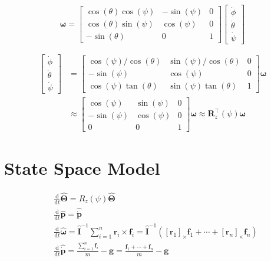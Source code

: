 \documentclass{article}
\begin{document}
$$
\boldsymbol{\omega}=\left[\begin{array}{ccc}
    \cos (\theta) \cos (\psi) & -\sin (\psi) & 0 \\
    \cos (\theta) \sin (\psi) & \cos (\psi) & 0 \\
    -\sin (\theta) & 0 & 1
    \end{array}\right]\left[\begin{array}{l}
    \dot{\phi} \\
    \dot{\theta} \\
    \dot{\psi}
\end{array}\right]
$$

\begin{align}
    \left[\begin{array}{l}
    \dot{\phi} \\
    \dot{\theta} \\
    \dot{\psi}
    \end{array}\right] &=\left[\begin{array}{ccc}
    \cos (\psi) / \cos (\theta) & \sin (\psi) / \cos (\theta) & 0 \\
    -\sin (\psi) & \cos (\psi) & 0 \\
    \cos (\psi) \tan (\theta) & \sin (\psi) \tan (\theta) & 1
    \end{array}\right] \boldsymbol{\omega} \\
    & \approx\left[\begin{array}{ccc}
    \cos (\psi) & \sin (\psi) & 0 \\
    -\sin (\psi) & \cos (\psi) & 0 \\
    0 & 0 & 1
    \end{array}\right] \boldsymbol{\omega} \approx \mathbf{R}_{z}^{\top}(\psi) \boldsymbol{\omega}
\end{align}

\section{State Space Model}

\begin{align}
    &\frac{\mathrm d}{\mathrm d t} \hat{\mathbf\Theta}=R_{z}(\psi) \hat{\mathbf\Theta} \\
    &\frac{\mathrm d}{\mathrm d t} \hat{\mathbf p}=\hat{\dot{\mathbf p}} \\
    &\frac{\mathrm d}{\mathrm d t} \hat{\mathbf \omega}=\hat{\mathbf I}^{-1} \sum_{i=1}^{n} \mathbf r_{i} \times \mathbf f_{i}=\hat{\mathbf I}^{-1}\left(\left[\mathbf r_{1}\right]_{\times} \mathbf f_{1}+\cdots+\left[\mathbf r_{n}\right]_{\times} \mathbf f_{n}\right) \\
    &\frac{\mathrm d}{\mathrm d t} \hat{\dot{\mathbf p}}=\frac{\sum_{i=1}^{n} \mathbf f_{i}}{m}-\mathbf g=\frac{\mathbf f_{1}+\cdots+\mathbf f_{n}}{m}-\mathbf g
\end{align}
\end{document}
